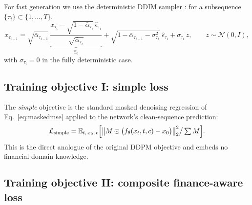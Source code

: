 \documentclass[12pt,letterpaper]{article}
\begin{document}
For fast generation we use the deterministic DDIM sampler
\citep{song2020ddim}: for a subsequence $\{\tau_i\} \subset \{1,\dots,T\}$,
\begin{equation}
x_{\tau_{i-1}}
= \sqrt{\bar\alpha_{\tau_{i-1}}}\,
\underbrace{\frac{x_{\tau_i} - \sqrt{1-\bar\alpha_{\tau_i}}\,
\hat\epsilon_{\tau_i}}{\sqrt{\bar\alpha_{\tau_i}}}}_{\hat x_0}
+ \sqrt{1-\bar\alpha_{\tau_{i-1}} - \sigma_{\tau_i}^2}\;\hat\epsilon_{\tau_i}
+ \sigma_{\tau_i}\, z,
\qquad z \sim \mathcal{N}(0, I),
\end{equation}
with $\sigma_{\tau_i} = 0$ in the fully deterministic case.

\subsection{Training objective I: simple loss}\label{sec:simpleloss}

The \emph{simple} objective is the standard masked denoising regression of
Eq.~\eqref{eq:maskedmse} applied to the network's clean-sequence prediction:
\begin{equation}
\mathcal{L}_{\mathrm{simple}}
= \mathbb{E}_{t,\,x_0,\,\epsilon}
\Bigl[\bigl\| M \odot \bigl(f_\theta(x_t, t, c) - x_0\bigr) \bigr\|_2^2
\big/ \textstyle\sum M \Bigr].
\label{eq:simple}
\end{equation}
This is the direct analogue of the original DDPM objective and embeds no
financial domain knowledge.

\subsection{Training objective II: composite finance-aware loss}\label{sec:complexloss}
\end{document}
